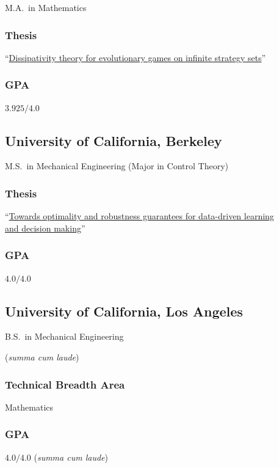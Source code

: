 \hspace*{\sectionwidth}M.A.\ in Mathematics

\subsubsection{Thesis}
``\href{https://brendon-anderson.github.io/files/publications/ma_thesis.pdf}{Dissipativity theory for evolutionary games on infinite strategy sets}''

\begin{gpa-on}
	\subsubsection{GPA}
	$3.925/4.0$
\end{gpa-on}

\vspace*{\subsectionskip}

\subsection{University of California, Berkeley}

\hspace*{\sectionwidth}M.S.\ in Mechanical Engineering (Major in Control Theory)

\subsubsection{Thesis}
``\href{https://brendon-anderson.github.io/files/publications/ms_thesis.pdf}{Towards optimality and robustness guarantees for data-driven learning \\
\hspace*{\sectionwidth}and decision making}''

\begin{gpa-on}
	\subsubsection{GPA}
	$4.0/4.0$
\end{gpa-on}

\vspace*{\subsectionskip}

\subsection{University of California, Los Angeles}

\hspace*{\sectionwidth}B.S.\ in Mechanical Engineering
\begin{gpa-off}
	(\textit{summa cum laude})
\end{gpa-off}

\subsubsection{Technical Breadth Area}
Mathematics

\begin{gpa-on}
	\subsubsection{GPA}
	$4.0/4.0$ (\textit{summa cum laude})
\end{gpa-on}
